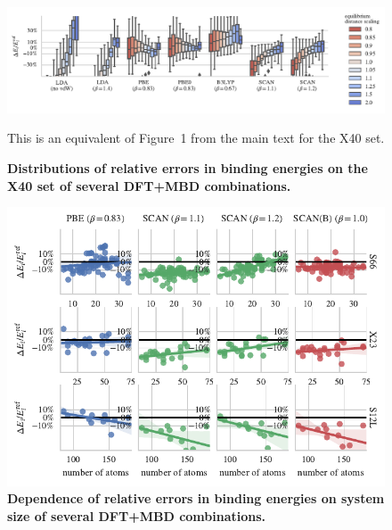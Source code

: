 \documentclass[twocolumn]{article}
\begin{document}
\begin{figure}
\includegraphics[center]{media/x40-dists}
\caption{\textbf{Distributions of relative errors in binding energies on the  X40 set of several DFT+MBD combinations.}
}\label{fig:x40-dists}
This is an equivalent of Figure~1 from the main text for the X40 set.
\end{figure}

\begin{figure}
\includegraphics[center]{media/size-dependence}
\caption{\textbf{Dependence of relative errors in binding energies on system size of several DFT+MBD combinations.}
}\label{fig:size-dependence}
\end{figure}
\end{document}
